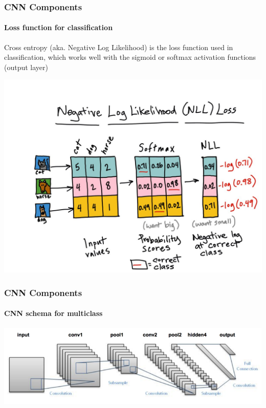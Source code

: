 \documentclass[]{beamer}
\begin{document}
\begin{frame}
  \frametitle{CNN Components}
  \framesubtitle{Loss function for classification}
  \alert{Cross entropy} (aka. Negative Log Likelihood) is the loss function used in classification, which works well with the \alert{sigmoid} or \alert{softmax} activation functions (output layer)
  \begin{center}
    \includegraphics[width=0.7\linewidth]{resources/nll}
  \end{center}
\end{frame}

\begin{frame}
  \frametitle{CNN Components}
  \framesubtitle{CNN schema for multiclass}
  \begin{center}
    \includegraphics[width=\linewidth]{resources/cnn_schema}
  \end{center}
\end{frame}
\end{document}
